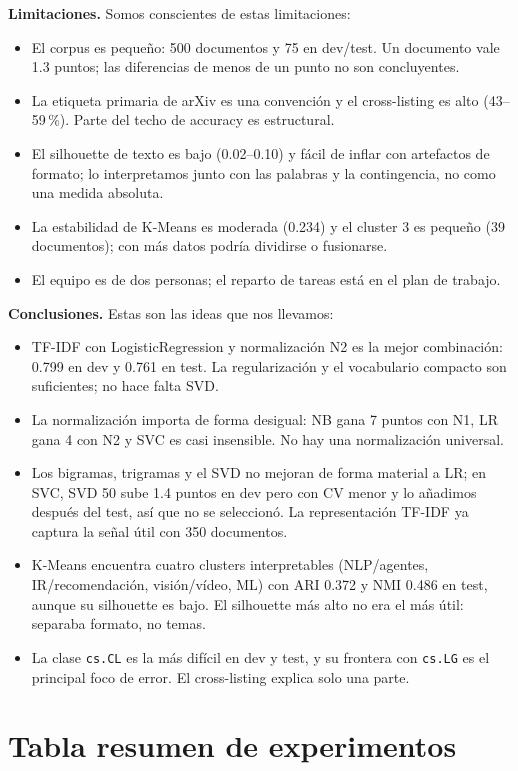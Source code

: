 \documentclass[11pt,a4paper]{article}
\newcommand{\code}[1]{\texttt{#1}}
\begin{document}
\textbf{Limitaciones.}
Somos conscientes de estas limitaciones:
\begin{itemize}[leftmargin=1.4em]
\item El corpus es pequeño: 500 documentos y 75 en dev/test. Un documento vale 1.3 puntos;
las diferencias de menos de un punto no son concluyentes.
\item La etiqueta primaria de arXiv es una convención y el cross-listing es alto (43--59\,\%).
Parte del techo de accuracy es estructural.
\item El silhouette de texto es bajo (0.02--0.10) y fácil de inflar con artefactos de
formato; lo interpretamos junto con las palabras y la contingencia, no como una medida absoluta.
\item La estabilidad de K-Means es moderada (0.234) y el cluster 3 es pequeño (39
documentos); con más datos podría dividirse o fusionarse.
\item El equipo es de dos personas; el reparto de tareas está en el plan de trabajo.
\end{itemize}

\textbf{Conclusiones.}
Estas son las ideas que nos llevamos:
\begin{itemize}[leftmargin=1.4em]
\item TF-IDF con LogisticRegression y normalización N2 es la mejor combinación: 0.799 en
dev y 0.761 en test. La regularización y el vocabulario compacto son suficientes; no hace
falta SVD.
\item La normalización importa de forma desigual: NB gana 7 puntos con N1, LR gana 4 con
N2 y SVC es casi insensible. No hay una normalización universal.
\item Los bigramas, trigramas y el SVD no mejoran de forma material a LR; en SVC, SVD 50
sube 1.4 puntos en dev pero con CV menor y lo añadimos después del test, así que no se
seleccionó. La representación TF-IDF ya captura la señal útil con 350 documentos.
\item K-Means encuentra cuatro clusters interpretables (NLP/agentes, IR/recomendación,
visión/vídeo, ML) con ARI 0.372 y NMI 0.486 en test, aunque su silhouette es bajo. El
silhouette más alto no era el más útil: separaba formato, no temas.
\item La clase \code{cs.CL} es la más difícil en dev y test, y su frontera con
\code{cs.LG} es el principal foco de error. El cross-listing explica solo una parte.
\end{itemize}

\clearpage
\appendix
\section{Tabla resumen de experimentos}
\end{document}
